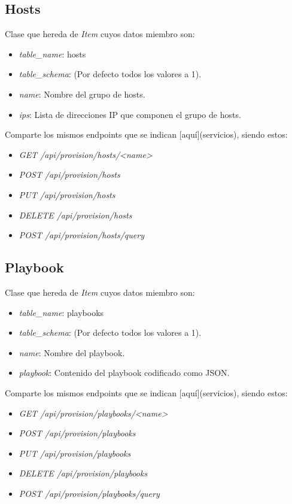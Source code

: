 \subsection{Hosts}

Clase que hereda de \textit{Item} cuyos datos miembro son:
\begin{itemize}
	\item \textit{table\_name}: hosts
	\item \textit{table\_schema}: (Por defecto todos los valores a 1).
	\item \textit{name}: Nombre del grupo de hosts.
	\item \textit{ips}: Lista de direcciones IP que componen el grupo de hosts.
\end{itemize}
	
\bigskip
Comparte los mismos endpoints que se indican [aquí](servicios), siendo estos:
\begin{itemize}
	\item \textit{GET /api/provision/hosts/<name>}
	\item \textit{POST /api/provision/hosts}
	\item \textit{PUT /api/provision/hosts}
	\item \textit{DELETE /api/provision/hosts}
	\item \textit{POST /api/provision/hosts/query}
\end{itemize}


\subsection{Playbook}

Clase que hereda de \textit{Item} cuyos datos miembro son:
\begin{itemize}
	\item \textit{table\_name}: playbooks
	\item \textit{table\_schema}: (Por defecto todos los valores a 1).
	\item \textit{name}: Nombre del playbook.
	\item \textit{playbook}: Contenido del playbook codificado como JSON.
\end{itemize}
	
\bigskip
Comparte los mismos endpoints que se indican [aquí](servicios), siendo estos:
\begin{itemize}
	\item \textit{GET /api/provision/playbooks/<name>}
	\item \textit{POST /api/provision/playbooks}
	\item \textit{PUT /api/provision/playbooks}
	\item \textit{DELETE /api/provision/playbooks}
	\item \textit{POST /api/provision/playbooks/query}
\end{itemize}

